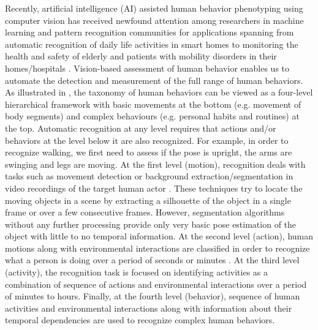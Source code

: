 Recently, artificial intelligence (AI) assisted human behavior phenotyping using computer vision has received newfound attention among researchers in machine learning and pattern recognition communities for applications spanning from automatic recognition of daily life activities in smart homes to monitoring the health and safety of elderly and patients with mobility disorders in their homes/hospitals \cite{vrigkas2015review,chaaraoui2012review,chen2018robust,ostadabbas2016vision}. Vision-based assessment of human behavior enables us to automate the detection and measurement of the full range of human behaviors. As illustrated in , the taxonomy of human behaviors can be viewed as a four-level hierarchical framework with basic movements at the bottom (e.g. movement of body segments) and complex behaviours (e.g. personal habits and routines) at the top. Automatic recognition at any level requires that actions and/or behaviors at the level below it are also recognized. For example, in order to recognize walking, we first need to assess if the pose is upright, the arms are swinging and legs are moving. At the first level (motion), recognition deals with tasks such as movement detection or background extraction/segmentation in video recordings of the target human actor \cite{rezaei2017background, 7952497, 8456638}. These techniques try to locate the moving objects in a scene by extracting a silhouette of the object in a single frame or over a few consecutive frames. However, segmentation algorithms without any further processing provide only very basic pose estimation of the object with little to no temporal information. At the second level (action), human motions along with environmental interactions are classified in order to recognize what a person is doing over a period of seconds or minutes \cite{herath2017going}. At the third level (activity), the recognition task is focused on identifying activities as a combination of sequence of actions and environmental interactions over a period of minutes to hours. Finally, at the fourth level (behavior), sequence of human activities and environmental interactions along with information about their temporal dependencies are used to recognize complex human behaviors.


